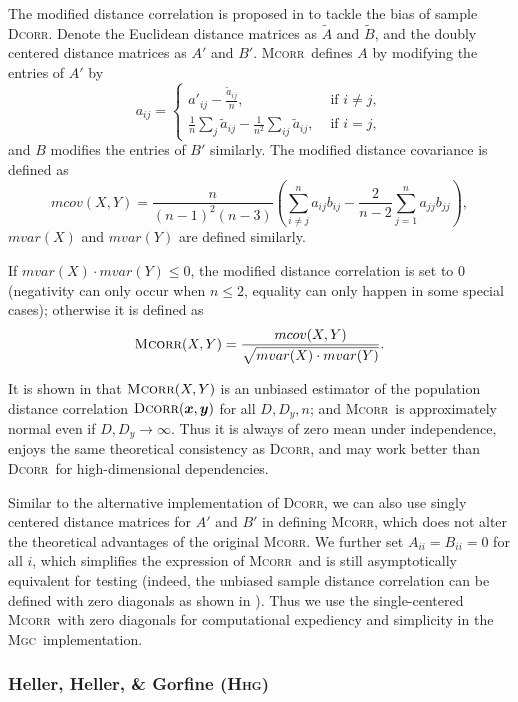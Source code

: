 \documentclass[11pt]{article}
\providecommand{\sct}[1]{{\normalfont\textsc{#1}}}
\providecommand{\mb}[1]{\boldsymbol{#1}}
\newcommand{\Mgc}{\sct{Mgc}}
\newcommand{\Hhg}{\sct{Hhg}}
\newcommand{\Dcorr}{\sct{Dcorr}}
\newcommand{\Mcorr}{\sct{Mcorr}}
\begin{document}
The modified distance correlation is proposed in \cite{SzekelyRizzo2013a} to tackle the bias of sample \Dcorr. Denote the Euclidean distance matrices as $\tilde{A}$ and $\tilde{B}$, and the doubly centered distance matrices as $A'$ and $B'$.  \Mcorr~defines $A$ by modifying the entries of $A'$ by
\[a_{ij} = \left\{
  \begin{array}{lr}
    a'_{ij}-\frac{\tilde{a}_{ij}}{n}, & \mbox{ if } i \neq j, \\
    \frac{1}{n}\sum_{j}\tilde{a}_{ij}-\frac{1}{n^2}\sum_{ij}\tilde{a}_{ij}, &\mbox{ if } i = j,
  \end{array}
\right.
\]
and $B$ modifies the entries of $B'$ similarly.
The modified distance covariance is defined as
\begin{equation*}
mcov(X,Y)=\frac{n}{(n-1)^2(n-3)}\left(\sum_{i \neq j}^{n}a_{ij}b_{ij}-\frac{2}{n-2}\sum_{j=1}^{n}a_{jj}b_{jj}\right),
\end{equation*}
$mvar(X)$ and $mvar(Y)$ are defined similarly.

If $mvar(X) \cdot mvar(Y) \leq 0$, the modified distance correlation is set to $0$ (negativity can only occur when $n\leq 2$, equality can only happen in some special cases); otherwise it is defined as
\begin{equation*}
\Mcorr(X,Y)=\frac{mcov(X,Y)}{\sqrt{mvar(X) \cdot mvar(Y)}}.
\end{equation*}

It is shown in \cite{SzekelyRizzo2013a} that $\Mcorr(X,Y)$ is an unbiased estimator of the population distance correlation $\Dcorr(\mb{x},\mb{y})$ for all $D, D_y, n$; and \Mcorr~is approximately normal even if $D,D_y \rightarrow \infty$. Thus it is always of zero mean under independence, enjoys the same theoretical consistency as \Dcorr, and may work better than \Dcorr~for high-dimensional dependencies.

Similar to the alternative implementation of \Dcorr, we can also use singly centered distance matrices for $A'$ and $B'$ in defining \Mcorr, which does not alter the theoretical advantages of the original \Mcorr. We further set $A_{ii}=B_{ii}=0$ for all $i$, which simplifies the expression of \Mcorr~and is still asymptotically equivalent for testing (indeed, the unbiased sample distance correlation can be defined with zero diagonals as shown in \cite{SzekelyRizzo2014,RizzoSzekely2016}). Thus we use the single-centered \Mcorr~with zero diagonals for computational expediency and simplicity in the \Mgc~implementation.

\subsubsection{Heller, Heller, \& Gorfine (\Hhg)}
\label{appen:hhg}
\end{document}
